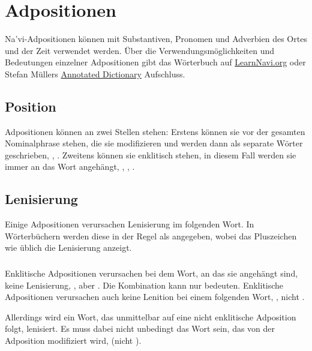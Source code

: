 \section{Adpositionen}
\noindent Na'vi-Adpositionen können mit Substantiven, Pronomen und Adverbien des Ortes und der Zeit verwendet werden. Über die Verwendungsmöglichkeiten und Bedeutungen einzelner Adpositionen gibt das Wörterbuch auf \href{https://learnnavi.org/navi-vocabulary/}{LearnNavi.org} oder Stefan Müllers \href{https://forum.learnnavi.org/index.php?msg=613941}{Annotated Dictionary} Aufschluss.

\subsection{Position} Adpositionen können an zwei Stellen stehen: Erstens können sie vor der gesamten Nominalphrase stehen, die sie modifizieren und werden dann als separate Wörter geschrieben,  ,  . Zweitens können sie enklitisch stehen, in diesem Fall werden sie immer an das Wort angehängt,  ,  ,  .
\label{syn:adp:position}

\subsection{Lenisierung} Einige Adpositionen verursachen Lenisierung im folgenden Wort. In Wörterbüchern werden diese in der Regel als  angegeben, wobei das Pluszeichen wie üblich die Lenisierung anzeigt.

\subsubsection{} Enklitische Adpositionen verursachen bei dem Wort, an das sie angehängt sind, keine Lenisierung,  , aber . Die Kombination  kann nur  bedeuten. Enklitische Adpositionen verursachen auch keine Lenition bei einem folgenden Wort,  , nicht .

Allerdings wird ein Wort, das unmittelbar auf eine nicht enklitische Adposition folgt, lenisiert. Es muss dabei nicht unbedingt das Wort sein, das von der Adposition modifiziert wird,   (nicht ).

